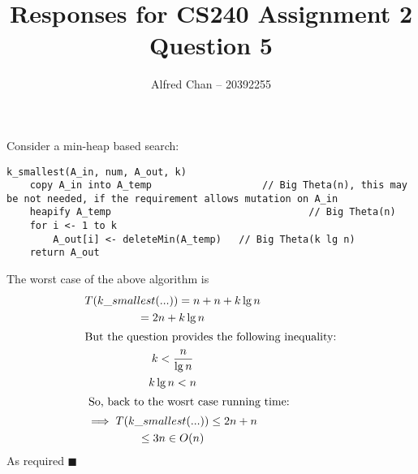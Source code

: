 \documentclass[12pt]{article}
\title{Responses for CS240 Assignment 2 Question 5}
\author{Alfred Chan -- 20392255}
\begin{document}
\maketitle
{}

Consider a min-heap based search:\\

\begin{lstlisting}
k_smallest(A_in, num, A_out, k) 
	copy A_in into A_temp 					// Big Theta(n), this may be not needed, if the requirement allows mutation on A_in
	heapify A_temp 									// Big Theta(n)
	for i <- 1 to k
		A_out[i] <- deleteMin(A_temp)	// Big Theta(k lg n)
	return A_out
\end{lstlisting}
The worst case of the above algorithm is
\begin{gather*}
T(k\_smallest(...)) = n + n + k\lg n\\
= 2n + k\lg n\\
\intertext{But the question provides the following inequality:}
k < \frac{n}{\lg n}\\
k \lg n < n\\
\intertext{ So, back to the wosrt case running time:}
\implies T(k\_smallest(...)) \le 2n + n\\
\le 3n \in O(n)
\end{gather*}
As required
\hfill $\blacksquare$
\end{document}
